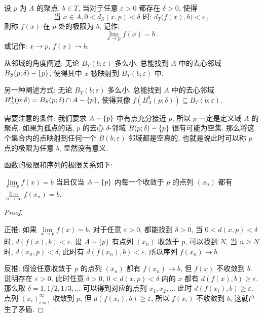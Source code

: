 \documentclass[UTF8]{ctexart}
\theoremstyle{mystyle}
\DeclarePairedDelimiter\set{\lbrace}{\rbrace}
\renewcommand{\epsilon}{\varepsilon}
\begin{document}
\begin{definition}
    设 $ p $ 为 $ A $ 的聚点, $ b \in T $, 当对于任意 $ \epsilon > 0 $ 都存在 $ \delta > 0 $, 使得
    \[ 
        \text{当 } x \in A , 0 < d_S(x, p) < \delta \text{ 时: }
        d_T \big( f(x), b \big) < \epsilon \,,
    \] 
    则称 $ f(x) $ 在 $ p $ 处的极限为 $ b $, 记作:
    \[ 
        \lim_{x \to p} f(x) = b \,.
    \]
    或记作: $ x \to p $, $ f(x) \to b $.
\end{definition}

从邻域的角度阐述: 无论 $ B_T(b; \epsilon) $ 多么小, 总能找到 $ A $ 中的去心邻域 $ B_S(p; \delta) - \set{p} $, 使得其中 $ x $ 被映射到 $ B_T(b; \epsilon) $ 中.

另一种阐述方式: 无论 $ B_T(b; \epsilon) $ 多么小, 总能找到 $ A $ 中的去心邻域 $ B_A^0(p; \delta) = B_S(p; \delta) \cap A - \set{p} $, 使得其像 $ f(B_A^0(p; \delta)) \subseteq B_T(b; \epsilon) $.

需要注意的条件: 我们要求 $ A - \set{p} $ 中有点充分接近 $ p $, 所以 $ p $ 一定是定义域 $ A $ 的聚点. 如果为孤点的话, $ p $ 的去心 $ \delta $-邻域 $ B(p; \delta) - \set{p} $ 很有可能为空集. 那么将这个集合内的点映射到任何一个 $ B(b; \epsilon) $ 邻域都是空真的, 也就是说此时可以称 $ p $ 点的极限为任意 $ b $, 显然没有意义.

函数的极限和序列的极限关系如下:
\begin{proposition}
    $ \lim\limits_{x \to p} f(x) = b $ 当且仅当 $ A - \set{p} $ 内每一个收敛于 $ p $ 的点列 $ (x_n) $ 都有 $ \lim\limits_{n \to \infty} f(x_n) = b $.
\end{proposition}

\begin{proof} \ 

    正推: 如果 $ \lim\limits_{x \to p} f(x) = b $, 对于任意 $ \epsilon > 0 $, 都能找到 $ \delta > 0 $, 当 $ 0 < d(x, p) < \delta $ 时, $ d(f(x), b) < \epsilon $. 设 $ A - \set{p} $ 有点列 $ (x_n) $ 收敛于 $ p $, 可以找到 $ N $, 当 $ n \geqslant N $ 时, $ d(x_n, p) < \delta $, 此时有 $ d(f(x_n), b) < \epsilon $. 所以序列 $ f(x_n) \to b $.

    反推: 假设任意收敛于 $ p $ 的点列 $ (x_n) $ 都有 $ f(x_n) \to b $, 但 $ f(x) $ 不收敛到 $ b $. 说明存在 $ \epsilon > 0 $, 此时任意 $ \delta > 0 $, $ 0 < d(x, p) < \delta $ 内的 $ x $ 都有 $ d(f(x), b) \geqslant \epsilon $. 那么取 $ \delta = 1, 1/2, 1/3, \dots $ 可以得到对应的点列 $ x_1, x_2, \dots $ 此时 $ d(f(x_i), b) \geqslant \epsilon $. 点列 $ (x_i)_{i = 1}^{\infty} $ 收敛到 $ p $, 但 $ d(f(x_i), b) \geqslant \epsilon $, 所以 $ f(x_i) $ 不收敛到 $ b $, 这就产生了矛盾.
\end{proof}
\end{document}
